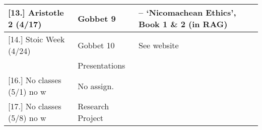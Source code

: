 \documentclass[article,oneside]{memoir}
\begin{document}
\begin{center}
\begin{longtable}{p{4.5cm}p{2cm}p{4.5cm}}
[13.] Aristotle 2  (4/17)			& Gobbet 9			& -- `Nicomachean Ethics', Book 1 \& 2 (in RAG) \\ [1.8\baselineskip] \hline
												 
[14.] Stoic Week (4/24)			& Gobbet 10 &  See website \\ 
							& Presentations & \\  [1.8\baselineskip] \hline


[16.] No classes (5/1) no w		& No assign.			& \\ [1.8\baselineskip] \hline
	
[17.] No classes (5/8) no w		& Research Project 	& \\ [1.8\baselineskip] \hline

\end{longtable}
\end{center}
\end{document}
